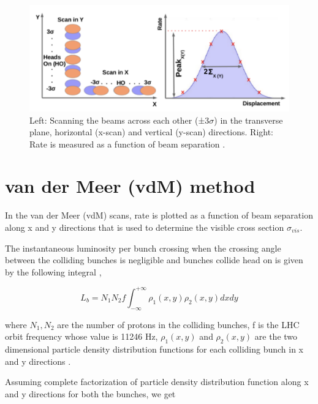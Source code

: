 \begin{figure}[h]
    \centering
    \includegraphics[width=1\textwidth]{ashish_thesis/vdm_method_new.png}
    \caption[vdM Scan Schematic]{Left: Scanning the beams across each other (±3$\sigma$) in the transverse plane, horizontal (x-scan) and vertical (y-scan) directions. Right: Rate is measured as a function of beam separation \cite{karacheban2017luminosity}.}
    \label{fig:vdm_scan_method}
\end{figure}

\section{van der Meer (vdM) method}

In the van der Meer (vdM) scans,  rate is plotted as a function of beam separation along x and y directions that is used to determine the visible cross section $\sigma_{vis}$.

The instantaneous luminosity  per bunch crossing when the crossing angle between the colliding bunches is negligible and bunches collide head on is given by the following integral \cite{CMS-PAS-LUM-13-001}, 

\begin{equation}
L_{b} = N_1 N_2 f \int^{+\infty}_{-\infty} \rho_1(x,y) \rho_2(x, y) dx dy 
\end{equation}

where $N_1, N_2$ are the number of protons in the colliding bunches, f is the LHC orbit frequency whose value is 11246 Hz,  $\rho_1(x,y)$ and $\rho_2(x,y)$ are the two dimensional particle density distribution functions for each colliding bunch in x and y directions  \cite{CMS-PAS-LUM-17-004}. 

Assuming complete factorization of particle density distribution function along x and y directions for both the bunches, we get 


